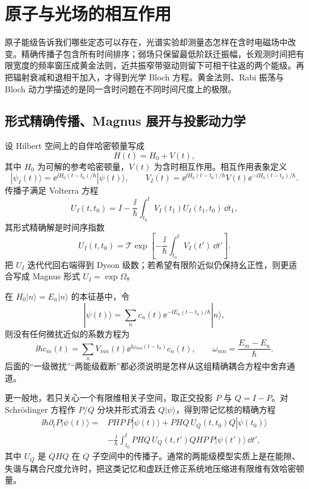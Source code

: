 \section{原子与光场的相互作用}
\label{ch:time-dependent-perturbation}

原子能级告诉我们哪些定态可以存在，光谱实验却测量态怎样在含时电磁场中改变。精确传播子包含所有时间排序；弱场只保留最低阶跃迁振幅，长观测时间把有限宽度的频率窗压成黄金法则，近共振窄带驱动则留下可相干往返的两个能级。再把辐射衰减和退相干加入，才得到光学 Bloch 方程。黄金法则、Rabi 振荡与 Bloch 动力学描述的是同一含时问题在不同时间尺度上的极限。
\subsection{形式精确传播、Magnus 展开与投影动力学}

设 Hilbert 空间上的自伴哈密顿量写成
\begin{equation}
H(t)=H_0+V(t),
\label{eq:tdpt-hamiltonian-split}
\end{equation}
其中 $H_0$ 为可解的参考哈密顿量，$V(t)$ 为含时相互作用。相互作用表象定义
\[
|\psi_I(t)\rangle=\ee^{\ii H_0(t-t_0)/\hbar}|\psi(t)\rangle,
\qquad
V_I(t)=\ee^{\ii H_0(t-t_0)/\hbar}V(t)\ee^{-\ii H_0(t-t_0)/\hbar}.
\]
传播子满足 Volterra 方程
\[
U_I(t,t_0)=I-\frac{\ii}{\hbar}\int_{t_0}^{t}V_I(t_1)U_I(t_1,t_0)\,\dd t_1,
\]
其形式精确解是时间序指数
\begin{equation}
U_I(t,t_0)=\mathcal T\exp\!\left[-\frac{\ii}{\hbar}\int_{t_0}^{t}V_I(t')\,\dd t'\right].
\label{eq:interaction-propagator}
\end{equation}
把 $U_I$ 迭代代回右端得到 Dyson 级数；若希望有限阶近似仍保持幺正性，则更适合写成 Magnus 形式 $U_I=\exp\Omega$。

在 $H_0|n\rangle=E_n|n\rangle$ 的本征基中，令
\[
|\psi(t)\rangle=\sum_n c_n(t)\ee^{-\ii E_n(t-t_0)/\hbar}|n\rangle,
\]
则没有任何微扰近似的系数方程为
\begin{equation}
\ii\hbar\dot c_m(t)
=\sum_n V_{mn}(t)\ee^{\ii\omega_{mn}(t-t_0)}c_n(t),
\qquad
\omega_{mn}=\frac{E_m-E_n}{\hbar}.
\label{eq:tdpt-exact-coefficient}
\end{equation}
后面的“一级微扰”“两能级截断”都必须说明是怎样从这组精确耦合方程中舍弃通道。

更一般地，若只关心一个有限维相关子空间，取正交投影 $P$ 与 $Q=I-P$。对 Schr\"odinger 方程作 $P/Q$ 分块并形式消去 $Q|\psi\rangle$，得到带记忆核的精确方程
\begin{equation}
\begin{aligned}
\ii\hbar\partial_t P|\psi(t)\rangle
={}&PHP\,P|\psi(t)\rangle
+PHQ\,U_Q(t,t_0)Q|\psi(t_0)\rangle\\
&-\frac{\ii}{\hbar}\int_{t_0}^{t}
PHQ\,U_Q(t,t')QHP\,P|\psi(t')\rangle\,\dd t',
\end{aligned}
\label{eq:two-level-memory-kernel}
\end{equation}
其中 $U_Q$ 是 $QHQ$ 在 $Q$ 子空间中的传播子。通常的两能级模型实质上是在能隙、失谐与耦合尺度允许时，把这类记忆和虚跃迁修正系统地压缩进有限维有效哈密顿量。

